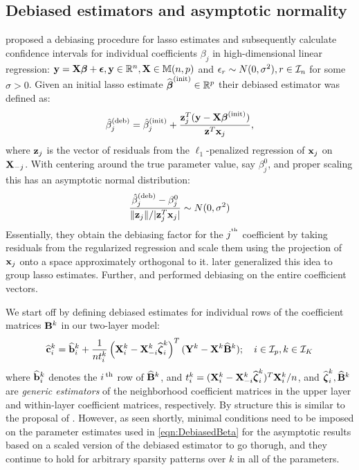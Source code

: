 \subsection{Debiased estimators and asymptotic normality}
\label{sec:testing-subsec-1}
\citet{ZhangZhang14} proposed a debiasing procedure for lasso estimates and subsequently calculate confidence intervals for individual coefficients $\beta_j$ in high-dimensional linear regression: ${\bf{y}} = {\mathbf{X}} {\boldsymbol{\beta}} + {\boldsymbol{\epsilon}}, {\bf{y}} \in {\mathbb{R}}^n, {\mathbf{X}} \in {\mathbb{M}}(n,p)$ and $\epsilon_r \sim N(0,\sigma^2), r \in {\cal{I}}_n$ for some $\sigma>0$. Given an initial lasso estimate $\widehat {{\boldsymbol{\beta}}}^{\text{(init)}} \in {\mathbb{R}}^p$ their debiased estimator was defined as:
%
$$
\hat \beta_j^{(\text{deb})} = \hat \beta_j^{(\text{init})} + \frac{{\bf{z}}_j^T ( {\bf{y}} - {\mathbf{X}} {\boldsymbol{\beta}}^{(\text{init})})}{{\bf{z}}^T {\bf{x}}_j},
$$
%
where ${\bf{z}}_j$ is the vector of residuals from the $\ell_1$-penalized regression of ${\bf{x}}_j$ on ${\mathbf{X}}_{-j}$. With centering around the true parameter value, say $\beta_j^0$, and proper scaling this has an asymptotic normal distribution:
%
$$
\frac{\hat \beta_j^{(\text{deb})} - \beta_j^0}{\| {\bf{z}}_j \|/| {\bf{z}}_j^T {\bf{x}}_j |} \sim N(0, \sigma^2)
$$
%
Essentially, they obtain the debiasing factor for the $j^{\operatorname*{^{\text{th}}}}$ coefficient by taking residuals from the regularized regression and scale them using the projection of ${\bf{x}}_j$ onto a space approximately orthogonal to it. \citet{MitraZhang16} later generalized this idea to group lasso estimates. Further, \citet{vanDeGeerEtal14} and \citet{JavanmardMontanari14} performed debiasing on the entire coefficient vectors.

We start off by defining debiased estimates for individual rows of the coefficient matrices ${\mathbf{B}}^k$ in our two-layer model:
%
\begin{align}\label{eqn:DebiasedBeta}
\widehat {{\bf{c}}}_i^k = \widehat {{\bf{b}}}_i^k + \frac{1}{n t_i^k} \left( {\mathbf{X}}_i^k - {\mathbf{X}}_{-i}^k \widehat {{\boldsymbol{\zeta}}}_i^k \right)^T ({\mathbf{Y}}^k - {\mathbf{X}}^k \widehat {{\mathbf{B}}}^k )
; \quad i \in {\cal{I}}_p, k \in {\cal{I}}_K
\end{align}
%
where $\widehat {{\bf{b}}}_i^k$ denotes the $i\operatorname*{^{\text{th}}}$ row of $\widehat {{\mathbf{B}}}^k$, and $t_i^k = ( {\mathbf{X}}_i^k - {\mathbf{X}}_{-i}^k \widehat {{\boldsymbol{\zeta}}}_i^k )^T {\mathbf{X}}_{i}^k/n$, and $\widehat {{\boldsymbol{\zeta}}}_i^k, \widehat {{\mathbf{B}}}^k$ are {\it generic estimators} of the neighborhood coefficient matrices in the upper layer and within-layer coefficient matrices, respectively. By structure this is similar to the proposal of \citet{ZhangZhang14}. However, as seen shortly, minimal conditions need to be imposed on the parameter estimates used in \eqref{eqn:DebiasedBeta} for the asymptotic results based on a scaled version of the debiased estimator to go thorugh, and they continue to hold for arbitrary sparsity patterns over $k$ in all of the parameters.

